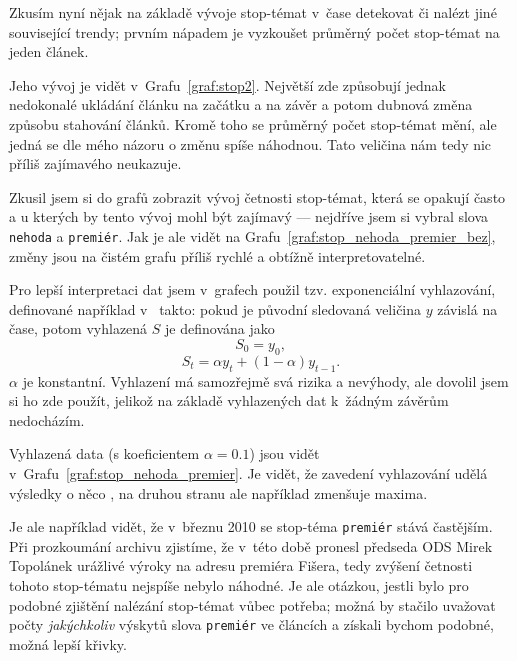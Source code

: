 \documentclass[12pt,a4paper]{report}
\begin{document}
Zkusím nyní nějak na základě vývoje stop-témat v~čase detekovat  či nalézt jiné související trendy; prvním nápadem je vyzkoušet průměrný počet stop-témat na jeden článek.


Jeho vývoj je vidět v~Grafu~\ref{graf:stop2}. Největší  zde způsobují jednak nedokonalé ukládání článku na začátku a na závěr a potom dubnová změna způsobu stahování článků. Kromě toho se průměrný počet stop-témat mění, ale jedná se dle mého názoru o změnu spíše náhodnou. Tato veličina nám tedy nic příliš zajímavého neukazuje.



Zkusil jsem si do grafů zobrazit vývoj četnosti stop-témat, která se opakují často a u kterých by tento vývoj mohl být zajímavý --- nejdříve jsem si vybral slova \texttt{nehoda} a \texttt{premiér}. Jak je ale vidět na Grafu~\ref{graf:stop_nehoda_premier_bez}, změny jsou na čistém grafu příliš rychlé a obtížně interpretovatelné.



Pro lepší interpretaci dat jsem v~grafech použil tzv. exponenciální vyhlazování, definované například v~\cite{nist} takto: pokud je původní sledovaná veličina $y$ závislá na čase, potom vyhlazená $S$ je definována jako $$S_0=y_0,$$ $$S_t=\alpha y_t+(1-\alpha)y_{t-1}.$$ $\alpha$ je konstantní. Vyhlazení má samozřejmě svá rizika a nevýhody, ale dovolil jsem si ho zde použít, jelikož na základě vyhlazených dat k~žádným  závěrům nedocházím.


Vyhlazená data (s koeficientem $\alpha=0.1$) jsou vidět v~Grafu~\ref{graf:stop_nehoda_premier}. Je vidět, že zavedení vyhlazování udělá výsledky o něco , na druhou stranu ale například zmenšuje maxima.

Je ale například vidět, že v~březnu 2010 se stop-téma \texttt{premiér} stává častějším. Při prozkoumání archivu zjistíme, že v~této době pronesl předseda ODS Mirek Topolánek urážlivé výroky na adresu premiéra Fišera, tedy zvýšení četnosti tohoto stop-tématu nejspíše nebylo náhodné. Je ale otázkou, jestli bylo pro podobné zjištění nalézání stop-témat vůbec potřeba; možná by stačilo uvažovat počty \emph{jakýchkoliv} výskytů slova \texttt{premiér} ve článcích a získali bychom podobné, možná lepší křivky.
\end{document}
